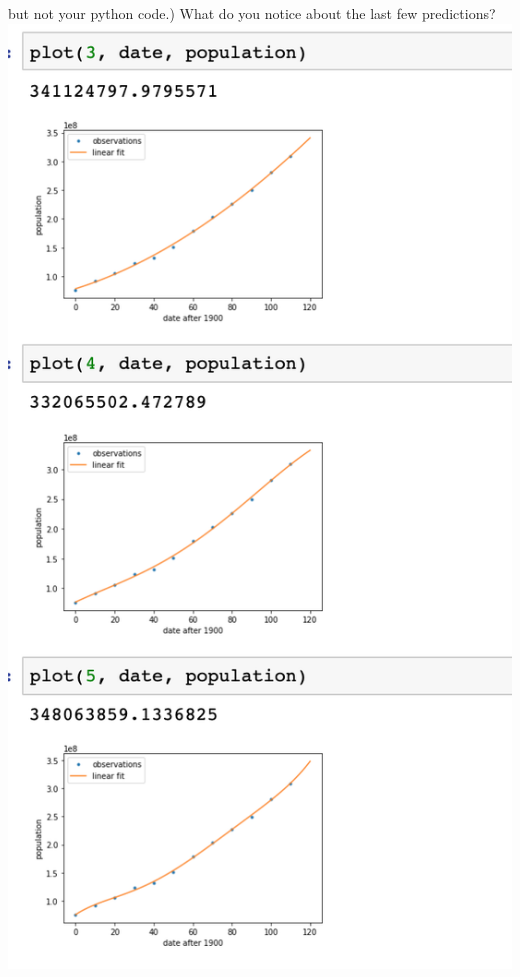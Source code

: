 \documentclass[11pt]{article}
\begin{document}
but not your python code.)
What do you notice about the last few predictions?\\
\includegraphics[scale = 0.7]{h51e1.png}
\end{document}
